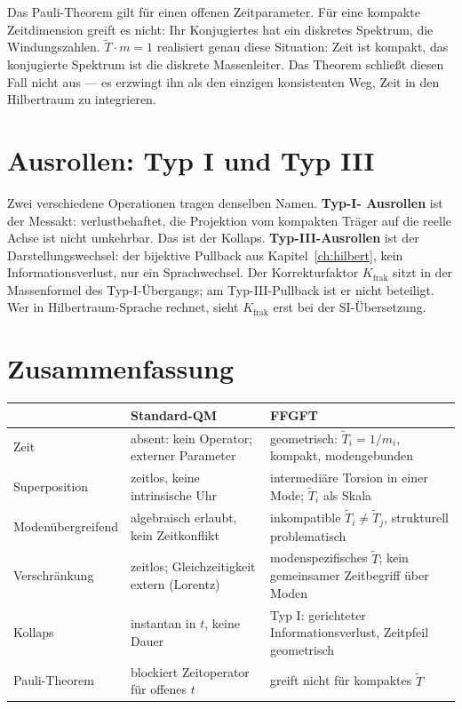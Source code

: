 Das Pauli-Theorem gilt für einen offenen Zeitparameter. Für eine
kompakte Zeitdimension greift es nicht: Ihr Konjugiertes hat ein
diskretes Spektrum, die Windungszahlen. $\tilde T\cdot m = 1$
realisiert genau diese Situation: Zeit ist kompakt, das konjugierte
Spektrum ist die diskrete Massenleiter. Das Theorem schließt diesen Fall
nicht aus --- es erzwingt ihn als den einzigen konsistenten Weg, Zeit in
den Hilbertraum zu integrieren.

\section{Ausrollen: Typ I und Typ III}

Zwei verschiedene Operationen tragen denselben Namen. \textbf{Typ-I-
Ausrollen} ist der Messakt: verlustbehaftet, die Projektion vom
kompakten Träger auf die reelle Achse ist nicht umkehrbar. Das ist der
Kollaps. \textbf{Typ-III-Ausrollen} ist der Darstellungswechsel: der
bijektive Pullback aus Kapitel~\ref{ch:hilbert}, kein Informationsverlust,
nur ein Sprachwechsel. Der Korrekturfaktor $K_{\mathrm{frak}}$ sitzt in der
Massenformel des Typ-I-Übergangs; am Typ-III-Pullback ist er nicht
beteiligt. Wer in Hilbertraum-Sprache rechnet, sieht $K_{\mathrm{frak}}$
erst bei der SI-Übersetzung.

\section{Zusammenfassung}

\begin{center}
\small\renewcommand{\arraystretch}{1.3}
\begin{tabular}{p{2.2cm}p{3.5cm}p{3.7cm}}
\toprule
 & \textbf{Standard-QM} & \textbf{FFGFT} \\
\midrule
Zeit & absent: kein Operator; externer Parameter & geometrisch: $\tilde T_i = 1/m_i$, kompakt, modengebunden \\
Superposition & zeitlos, keine intrinsische Uhr & intermediäre Torsion in einer Mode; $\tilde T_i$ als Skala \\
Modenübergreifend & algebraisch erlaubt, kein Zeitkonflikt & inkompatible $\tilde T_i\neq\tilde T_j$, strukturell problematisch \\
Verschränkung & zeitlos; Gleichzeitigkeit extern (Lorentz) & modenspezifisches $\tilde T$; kein gemeinsamer Zeitbegriff über Moden \\
Kollaps & instantan in $t$, keine Dauer & Typ I: gerichteter Informationsverlust, Zeitpfeil geometrisch \\
Pauli-Theorem & blockiert Zeitoperator für offenes $t$ & greift nicht für kompaktes $\tilde T$ \\
\bottomrule
\end{tabular}
\end{center}

